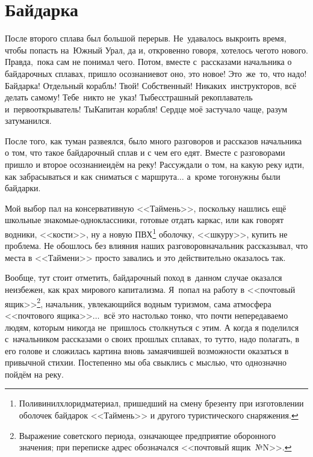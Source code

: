 \chapter{Байдарка}
\vepsianrose

После второго сплава был большой перерыв. Не~удавалось выкроить время, чтобы попасть на~Южный Урал, да и, откровенно говоря, хотелось чего\sdash то нового. Правда,~пока сам не понимал чего. Потом, вместе с~рассказами начальника о байдарочных сплавах, пришло осознание\mdash вот оно, это новое! Это~же~то, что надо! Байдарка! Отдельный корабль! Твой! Собственный! Никаких~инструкторов, всё делать самому! Тебе~никто не~указ! Ты\mdash бесстрашный рекоплаватель и~первооткрыватель! Ты\mdash Капитан корабля! Сердце моё застучало чаще, разум затуманился. 

\renewcommand*{\thefootnote}{\arabic{footnote}}
После того, как туман развеялся, было много разговоров и рассказов начальника о том, что такое байдарочный сплав и с чем его едят. Вместе с разговорами пришло и второе осознание\mdash идём на реку! Рассуждали о том, на какую реку идти, как забрасываться и как сниматься с маршрута$\ldots$ а~кроме того\mdash нужны были байдарки.

Мой выбор пал на консервативную <<Таймень>>, поскольку нашлись ещё школьные знакомые-одноклассники, готовые отдать каркас, или как говорят водники, <<кости>>, ну а новую ПВХ\footnote{Поливинилхлорид\mdash материал, пришедший на смену брезенту при изготовлении оболочек байдарок <<Таймень>> и другого туристического снаряжения.} оболочку, <<шкуру>>, купить не проблема. Не обошлось без влияния наших разговоров\mdash начальник рассказывал, что места в <<Таймени>> просто завались и это действительно оказалось так.

Вообще, тут стоит отметить, байдарочный поход в~данном случае оказался неизбежен, как крах мирового капитализма. Я~попал на работу в <<почтовый ящик>>\footnote{Выражение советского периода, означающее предприятие оборонного значения; при переписке адрес обозначался <<почтовый ящик~№N>>.}, начальник, увлекающийся водным туризмом, сама атмосфера <<почтового ящика>>$\ldots$~всё это настолько тонко, что почти непередаваемо людям, которым никогда не~пришлось столкнуться с этим. А когда я поделился с~начальником рассказами о своих прошлых сплавах, то тут\sdash то, надо полагать, в его голове и сложилась картина вновь замаячившей возможности оказаться в привычной стихии. Постепенно мы оба свыклись с мыслью, что однозначно пойдём на реку.

